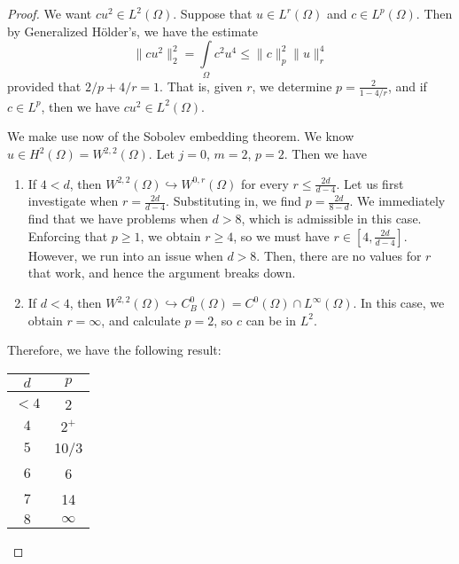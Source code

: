 \documentclass[letterpaper,twoside,11pt]{article}
\theoremstyle{mystyle}
\begin{document}
\begin{proof}
  We want $cu^2 \in L^2 \left( \Omega \right)$. Suppose that $u \in L^r \left( \Omega \right)$ and $c \in L^p (\Omega)$. Then by Generalized H\"older's, we have the estimate
  \[\|cu^2 \|_2^2 = \int\limits_\Omega c^2 u^4 \leq \|c\|_p^2 \|u\|_r^4 \]
  provided that $2/p+4/r=1$. That is, given $r$, we determine $p = \frac{2}{1-4/r}$, and if $c \in L^p$, then we have $c u ^2 \in L^2 \left( \Omega \right)$.  

  We make use now of the Sobolev embedding theorem. We know $ u \in H^2 \left( \Omega \right) = W^{2, 2} \left( \Omega \right)$. Let $j = 0$, $m = 2$, $p = 2$. Then we have 
  \begin{enumerate}
    \item If $4 < d$, then $W^{2,2} (\Omega) \hookrightarrow W^{0,r}\left( \Omega \right)$ for every $r\leq \frac{2d}{d-4}$. Let us first investigate when $r = \frac{2d}{d-4}$. Substituting in, we find $p = \frac{2d}{8-d}$. We immediately find that we have problems when $ d > 8$, which is admissible in this case. Enforcing that $p \geq 1$, we obtain $ r \geq 4$, so we must have $ r \in [4, \frac{2d}{d-4}]$. However, we run into an issue when $d > 8$. Then, there are no values for $r$ that work, and hence the argument breaks down. 
    
    \item If $d < 4$, then $W^{2,2} (\Omega) \hookrightarrow C_B^0 (\Omega) = C^0 (\Omega) \cap L^\infty (\Omega)$. In this case, we obtain $ r = \infty$, and calculate $ p = 2$, so $c$ can be in $L^2$. 
  \end{enumerate}

  Therefore, we have the following result: 

  \begin{table}[htbp]
	\centering
	\begin{tabular}{c|c}
		$d$ & $p$ \\ \hline
		$<4$ & 2 \\
		$4$ & $2^+$ \\
		$5$ & 10/3 \\
		$6$ & 6 \\
		$7$ & 14 \\
    $8$ & $\infty$ \\\hline
	\end{tabular}
\end{table}


\end{proof}
\end{document}
